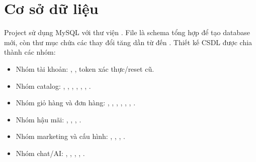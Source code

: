 \documentclass[12pt,a4paper]{report}
\begin{document}
\section{Cơ sở dữ liệu}

Project sử dụng MySQL với thư viện . File  là schema tổng hợp để tạo database mới, còn thư mục  chứa các thay đổi tăng dần từ  đến . Thiết kế CSDL được chia thành các nhóm:

\begin{itemize}
    \item Nhóm tài khoản: , , token xác thực/reset cũ.
    \item Nhóm catalog: , , , , , , .
    \item Nhóm giỏ hàng và đơn hàng: , , , , , , .
    \item Nhóm hậu mãi: , , , .
    \item Nhóm marketing và cấu hình: , , , .
    \item Nhóm chat/AI: , , , , .
\end{itemize}
\end{document}
